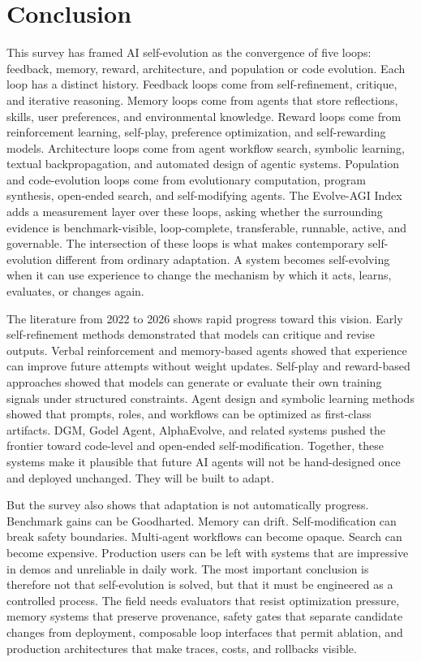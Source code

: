 \section{Conclusion}
\label{sec:conclusion}

This survey has framed AI self-evolution as the convergence of five loops: feedback, memory, reward, architecture, and population or code evolution. Each loop has a distinct history. Feedback loops come from self-refinement, critique, and iterative reasoning. Memory loops come from agents that store reflections, skills, user preferences, and environmental knowledge. Reward loops come from reinforcement learning, self-play, preference optimization, and self-rewarding models. Architecture loops come from agent workflow search, symbolic learning, textual backpropagation, and automated design of agentic systems. Population and code-evolution loops come from evolutionary computation, program synthesis, open-ended search, and self-modifying agents. The Evolve-AGI Index adds a measurement layer over these loops, asking whether the surrounding evidence is benchmark-visible, loop-complete, transferable, runnable, active, and governable. The intersection of these loops is what makes contemporary self-evolution different from ordinary adaptation. A system becomes self-evolving when it can use experience to change the mechanism by which it acts, learns, evaluates, or changes again.

The literature from 2022 to 2026 shows rapid progress toward this vision. Early self-refinement methods demonstrated that models can critique and revise outputs. Verbal reinforcement and memory-based agents showed that experience can improve future attempts without weight updates. Self-play and reward-based approaches showed that models can generate or evaluate their own training signals under structured constraints. Agent design and symbolic learning methods showed that prompts, roles, and workflows can be optimized as first-class artifacts. DGM, Godel Agent, AlphaEvolve, and related systems pushed the frontier toward code-level and open-ended self-modification. Together, these systems make it plausible that future AI agents will not be hand-designed once and deployed unchanged. They will be built to adapt.

But the survey also shows that adaptation is not automatically progress. Benchmark gains can be Goodharted. Memory can drift. Self-modification can break safety boundaries. Multi-agent workflows can become opaque. Search can become expensive. Production users can be left with systems that are impressive in demos and unreliable in daily work. The most important conclusion is therefore not that self-evolution is solved, but that it must be engineered as a controlled process. The field needs evaluators that resist optimization pressure, memory systems that preserve provenance, safety gates that separate candidate changes from deployment, composable loop interfaces that permit ablation, and production architectures that make traces, costs, and rollbacks visible.

